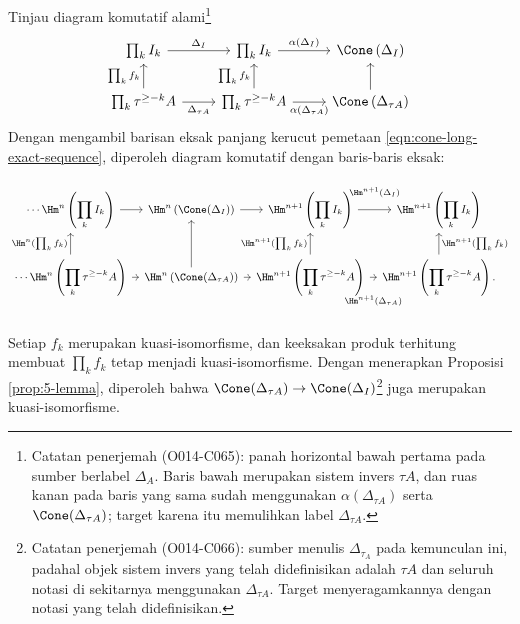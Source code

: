 \begin{bukti}
	Tinjau diagram komutatif alami\footnote{Catatan penerjemah (O014-C065):
	panah horizontal bawah pertama pada sumber berlabel $\Delta_A$. Baris bawah
	merupakan sistem invers $\tau A$, dan ruas kanan pada baris yang sama sudah
	menggunakan $\alpha(\Delta_{\tau A})$ serta $\Cone(\Delta_{\tau A})$; target
	karena itu memulihkan label $\Delta_{\tau A}$.}
	\[\begin{tikzcd}
		\prod_k I_k \arrow[r, "\Delta_I"] &
		\prod_k I_k \arrow[r, "{\alpha(\Delta_I)}"] &
		\Cone\left(\Delta_I\right) \\
		\prod_k \tau^{\geq-k}A \arrow[r, "\Delta_{\tau A}"']
		\arrow[u, "{\prod_k f_k}"] &
		\prod_k \tau^{\geq-k}A \arrow[u, "{\prod_k f_k}"]
		\arrow[r, "{\alpha(\Delta_{\tau A})}"'] &
		\Cone\left(\Delta_{\tau A}\right) \arrow[u]
	\end{tikzcd}\]
	Dengan mengambil barisan eksak panjang kerucut pemetaan
	\eqref{eqn:cone-long-exact-sequence}, diperoleh diagram komutatif dengan
	baris-baris eksak:
	\[\begin{tikzcd}
		[column sep=tiny, every cell/.append style = {font = \small}]
		\cdots \Hm^n\left( \displaystyle\prod_k I_k \right) \arrow[r] &
		\Hm^n\left( \Cone(\Delta_I) \right) \arrow[r] &
		\Hm^{n+1}\left( \displaystyle\prod_k I_k \right)
		\arrow[r, "{\Hm^{n+1}(\Delta_I)}" inner sep=1em] &
		\Hm^{n+1}\left( \displaystyle\prod_k I_k \right) \\
		\cdots \Hm^n\left( \displaystyle\prod_k \tau^{\geq-k} A \right)
		\arrow[r] \arrow[u, "{\Hm^n(\prod_k f_k)}"] &
		\Hm^n\left( \Cone(\Delta_{\tau A}) \right)
		\arrow[r] \arrow[u] &
		\Hm^{n+1}\left(\displaystyle\prod_k \tau^{\geq-k} A \right)
		\arrow[u, "{\Hm^{n+1}(\prod_k f_k)}"]
		\arrow[r, "{\Hm^{n+1}(\Delta_{\tau A})}"' inner sep=1.5em] &
		\Hm^{n+1}\left( \displaystyle\prod_k \tau^{\geq-k} A \right)
		\arrow[u, "{\Hm^{n+1}(\prod_k f_k)}"'] .
	\end{tikzcd}\]
	Setiap $f_k$ merupakan kuasi-isomorfisme, dan keeksakan produk terhitung
	membuat $\prod_k f_k$ tetap menjadi kuasi-isomorfisme. Dengan menerapkan
	Proposisi \ref{prop:5-lemma}, diperoleh bahwa
	$\Cone(\Delta_{\tau A})\to\Cone(\Delta_I)$\footnote{Catatan penerjemah
	(O014-C066): sumber menulis $\Delta_{\tau_A}$ pada kemunculan ini, padahal
	objek sistem invers yang telah didefinisikan adalah $\tau A$ dan seluruh
	notasi di sekitarnya menggunakan $\Delta_{\tau A}$. Target menyeragamkannya
	dengan notasi yang telah didefinisikan.} juga merupakan
	kuasi-isomorfisme.


\end{bukti}
